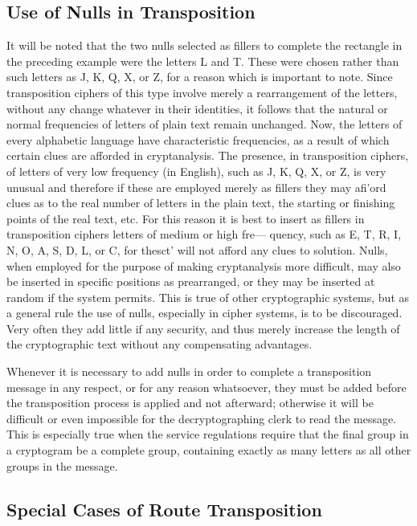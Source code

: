 \subsection{Use of Nulls in Transposition}

\mypara It will be noted that the two nulls selected as fillers to complete the
rectangle in the preceding example were the letters L and T. These were
chosen rather than such letters as J, K, Q, X, or Z, for a reason which
is important to note. Since transposition ciphers of this type involve
merely a rearrangement of the letters, without any change whatever in
their identities, it follows that the natural or normal frequencies of letters
of plain text remain unchanged. Now, the letters of every alphabetic
language have characteristic frequencies, as a result of which certain clues
are afforded in cryptanalysis. The presence, in transposition ciphers, of
letters of very low frequency (in English), such as J, K, Q, X, or Z, is
very unusual and therefore if these are employed merely as fillers they
may afi'ord clues as to the real number of letters in the plain text, the
starting or finishing points of the real text, etc. For this reason it is best
to insert as fillers in transposition ciphers letters of medium or high fre—
quency, such as E, T, R, I, N, O, A, S, D, L, or C, for thesct' will not
afford any clues to solution. Nulls, when employed for the purpose of
making cryptanalysis more difficult, may also be inserted in specific positions as prearranged, or they may be inserted at random if the system
permits. This is true of other cryptographic systems, but as a general
rule the use of nulls, especially in cipher systems, is to be discouraged.
Very often they add little if any security, and thus merely increase the
length of the cryptographic text without any compensating advantages.

\mypara Whenever it is necessary to add nulls in order to complete a transposition message in any respect, or for any reason whatsoever, they must
be added before the transposition process is applied and not afterward;
otherwise it will be difficult or even impossible for the decryptographing
clerk to read the message. This is especially true when the service regulations require that the final group in a cryptogram be a complete group,
containing exactly as many letters as all other groups in the message.


\subsection{Special Cases of Route Transposition}

